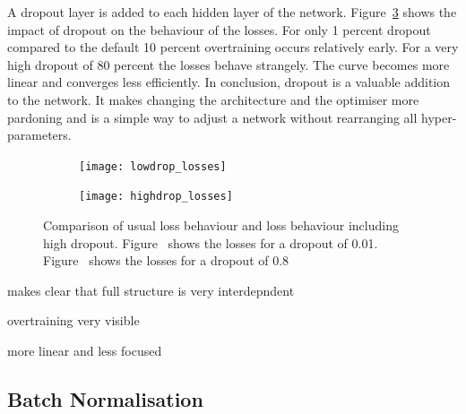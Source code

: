 A dropout layer is added to each hidden layer of the network.
Figure~\ref{fig:dropout} shows the impact of dropout on the behaviour of the losses. For only \num{1} percent dropout compared to the default \num{10} percent overtraining occurs relatively early. For a very high dropout of \num{80} percent the losses behave strangely. The curve becomes more linear and converges less efficiently. In conclusion, dropout is a valuable addition to the network. It makes changing the architecture and the optimiser more pardoning and is a simple way to adjust a network without rearranging all hyper-parameters.

\begin{figure}[htbp]
    \centering
    \begin{subfigure}[b]{0.45\textwidth}
        \texttt{[image: lowdrop\_losses]}
        \caption{}
        \label{fig:dropout:low}
    \end{subfigure}
\quad
    \begin{subfigure}[b]{0.45\textwidth}
        \texttt{[image: highdrop\_losses]}
        \caption{}
        \label{fig:dropout:high}
    \end{subfigure}
    \caption{Comparison of usual loss behaviour and loss behaviour including high dropout. Figure~ shows the losses for a dropout of \num{0.01}. Figure~ shows the losses for a dropout of \num{0.8}}
	\label{fig:dropout}
\end{figure}

makes clear that full structure is very interdepndent

overtraining very visible

more linear and less focused

\subsection{Batch Normalisation}